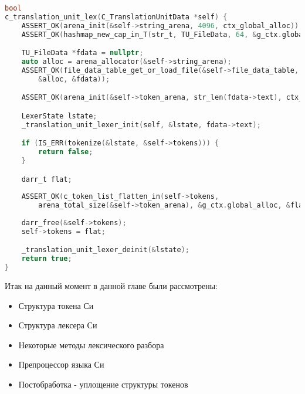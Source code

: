 \begin{lstlisting}[language=c, caption={Функция этапа лексического разбора}, label={lexing:pass-fn}]
bool
c_translation_unit_lex(C_TranslationUnitData *self) {
    ASSERT_OK(arena_init(&self->string_arena, 4096, ctx_global_alloc));
    ASSERT_OK(hashmap_new_cap_in_T(str_t, TU_FileData, 64, &g_ctx.global_alloc, &self->file_data_table));

    TU_FileData *fdata = nullptr;
    auto alloc = arena_allocator(&self->string_arena);
    ASSERT_OK(file_data_table_get_or_load_file(&self->file_data_table, self->main_file, nullptr, 
        &alloc, &fdata));

    ASSERT_OK(arena_init(&self->token_arena, str_len(fdata->text), ctx_global_alloc));

    LexerState lstate;
    _translation_unit_lexer_init(self, &lstate, fdata->text);

    if (IS_ERR(tokenize(&lstate, &self->tokens))) {
        return false;
    }

    darr_t flat;
    
    ASSERT_OK(c_token_list_flatten_in(self->tokens, 
        arena_total_size(&self->token_arena), &g_ctx.global_alloc, &flat));
    
    darr_free(&self->tokens);
    self->tokens = flat;

    _translation_unit_lexer_deinit(&lstate);
    return true;
}
\end{lstlisting}

Итак на данный момент в данной главе были рассмотрены:
\begin{itemize}
  \item Структура токена Си
  \item Структура лексера Си
  \item Некоторые методы лексического разбора
  \item Препроцессор языка Си
  \item Постобработка - уплощение структуры токенов
\end{itemize}